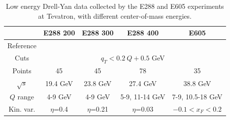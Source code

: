 \documentclass[aps,preprintnumbers,showpacs,nofootinbib,superscriptaddress,floatfix]{revtex4}
\begin{document}
\begin{table}[h!]
\begin{center}
\renewcommand{\tabcolsep}{0.4pc} %
\renewcommand{\arraystretch}{1.2} %
\begin{tabular}{|c|c|c|c|c|}
 \hline
 ~                        &  E288 200    &  E288 300        &  E288 400          &  E605                \\
 \hline
Reference               &  \cite{Ito:1980ev}  &   \cite{Ito:1980ev}  &  \cite{Ito:1980ev}  &   \cite{Moreno:1990sf}  \\
\hline
Cuts             & \multicolumn{4}{c|}{$q_T < 0.2\ Q +0.5$ GeV}
\\
 \hline
 Points                   &      45      &   45             &       78           &     35               \\
 \hline
 $\sqrt{s}$               &    19.4 GeV   &   23.8 GeV        &      27.4 GeV    &  38.8 GeV           \\
\hline
$Q$ range                 &  4-9 GeV      &  4-9 GeV         &  5-9, 11-14 GeV   &  7-9, 10.5-18 GeV   \\
 \hline
 Kin. var.           & $\eta$=0.4         &  $\eta$=0.21          &   $\eta$=0.03         &    $-0.1<x_F< 0.2$         \\
\hline
\end{tabular}
\caption{Low energy Drell-Yan data collected by the E288 and E605 experiments at Tevatron, with different center-of-mass energies.}
\label{t:data_DY}
\end{center}
\end{table}
\end{document}
